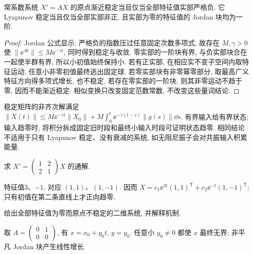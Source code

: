 \begin{theorem}\label{thm:linearstable}
常系数系统 $X'=AX$ 的原点渐近稳定当且仅当全部特征值实部严格负. 它 Lyapunov 稳定当且仅当全部实部非正, 且实部为零的特征值的 Jordan 块均为一阶.
\end{theorem}
\begin{proof}
Jordan 公式显示: 严格负的指数压过任意固定次数多项式, 故存在 $M,\gamma>0$ 使 $\|\ee^{At}\|\le M\ee^{-\gamma t}$, 同时得到稳定与收敛. 零实部的一阶块有界, 与负实部块合在一起使半群有界, 所以小初值始终保持小. 若有正实部, 在相应实不变子空间内取特征运动, 任意小非零初值最终逃出固定球. 若零实部块有非零幂零部分, 取最高广义特征方向得多项式增长, 也不稳定. 若存在零实部的一阶块, 则其非零运动不趋于零, 因而不能渐近稳定. 相似变换只改变固定范数常数, 不改变这些量词结论.
\end{proof}
稳定矩阵的非齐次解满足 $\|X(t)\|\le M\ee^{-\gamma t}\|X_0\|+M\int_0^t\ee^{-\gamma(t-s)}\|g(s)\|\dd s$. 有界输入给有界状态; 输入趋零时, 将积分拆成固定旧时段和最终小输入时段可证明状态趋零. 相同结论不适用于只有 Lyapunov 稳定、没有衰减的系统, 如无阻尼振子会对共振输入积累能量.
\begin{exercise}求 $X'=\begin{pmatrix}1&2\\2&1\end{pmatrix}X$ 的通解.\end{exercise}
\begin{solution}特征值3、$-1$, 对应 $(1,1)$、$(1,-1)$. 因而 $X=c_1\ee^{3t}(1,1)^{\mathsf T}+c_2\ee^{-t}(1,-1)^{\mathsf T}$; 只有初值在第二条直线上才正向趋零.\end{solution}
\begin{exercise}给出全部特征值为零而原点不稳定的二维系统, 并解释机制.\end{exercise}
\begin{solution}取 $A=\begin{pmatrix}0&1\\0&0\end{pmatrix}$, 有 $x=x_0+y_0t$, $y=y_0$. 任意小 $y_0\ne0$ 都使 $x$ 最终无界; 非平凡 Jordan 块产生线性增长.\end{solution}
